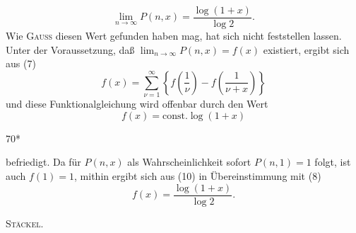\begin{equation*}\tag*{(8)}\lim_{n\to\infty}P(n,x)=\frac{\log(1+x)}{\log2}.\end{equation*}
\noindent Wie \textsc{Gauss} diesen Wert gefunden haben mag, hat sich nicht feststellen lassen. Unter der Voraussetzung, daß \(\displaystyle\lim_{n\to\infty}P(n,x)=f(x)\) existiert, ergibt sich aus (7)
\begin{equation*}\tag*{(9)}f(x)=\sum_{\nu=1}^{\infty}\left\{f\left(\frac1\nu\right)-f\left(\frac1{\nu+x}\right)\right\}\end{equation*}
\noindent und diese Funktionalgleichung wird offenbar durch den Wert
\begin{equation*}\tag*{(10)}f(x)=\text{const.}\log(1+x)\end{equation*}
\par\noindent\hfill70*
\par\endgroup

\clearpage{}
\par\begingroup\small
\noindent befriedigt. Da für \(P(n,x)\) als Wahrscheinlichkeit sofort \(P(n,1)=1\) folgt, ist auch \(f(1)=1\), mithin ergibt sich aus (10) in Übereinstimmung mit (8)
\[
f(x)=\frac{\log(1+x)}{\log2}.
\]
\par\noindent\hfill\textsc{Stäckel.}
\par\endgroup
